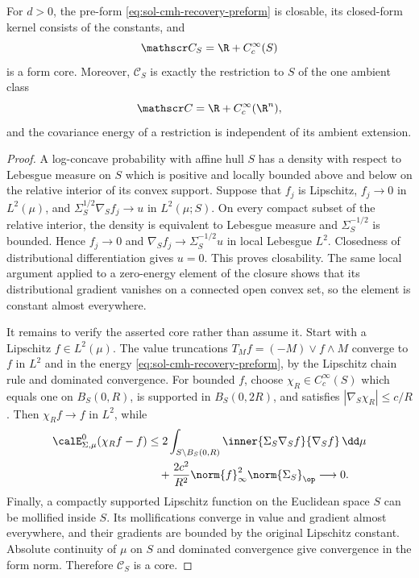 \documentclass[../main.tex]{subfiles}
\begin{document}
\begin{lemma}
\label{lem:sol-cmh-recovery-common-core}
For $d>0$, the pre-form \eqref{eq:sol-cmh-recovery-preform} is closable, its closed-form kernel
consists of the constants, and
\[
  \mathscr C_S=\R+C_c^\infty(S)
\]
is a form core.  Moreover, $\mathscr C_S$ is exactly the restriction to $S$ of the one ambient
class
\[
  \mathscr C=\R+C_c^\infty(\R^n),
  \label{eq:sol-cmh-recovery-ambient-core}
\]
and the covariance energy of a restriction is independent of its ambient extension.
\end{lemma}

\begin{proof}
A log-concave probability with affine hull $S$ has a density with respect to Lebesgue measure
on $S$ which is positive and locally bounded above and below on the relative interior of its
convex support.  Suppose that $f_j$ is Lipschitz,
$f_j\to0$ in $L^2(\mu)$, and $\Sigma_S^{1/2}\nabla_Sf_j\to u$ in
$L^2(\mu;S)$.  On every compact subset of the relative interior, the density is equivalent to
Lebesgue measure and $\Sigma_S^{-1/2}$ is bounded.  Hence
$f_j\to0$ and $\nabla_Sf_j\to\Sigma_S^{-1/2}u$ in local Lebesgue $L^2$.
Closedness of distributional differentiation gives $u=0$.  This proves closability.  The same
local argument applied to a zero-energy element of the closure shows that its distributional
gradient vanishes on a connected open convex set, so the element is constant almost
everywhere.

It remains to verify the asserted core rather than assume it.  Start with a Lipschitz
$f\in L^2(\mu)$.  The value truncations $T_Mf=(-M)\vee f\wedge M$ converge to $f$ in $L^2$
and in the energy \eqref{eq:sol-cmh-recovery-preform}, by the Lipschitz chain rule and dominated
convergence.  For bounded $f$, choose $\chi_R\in C_c^\infty(S)$ which equals one on
$B_S(0,R)$, is supported in $B_S(0,2R)$, and satisfies
$|\nabla_S\chi_R|\le c/R$.  Then $\chi_Rf\to f$ in $L^2$, while
\begin{align*}
 \calE^0_{\Sigma,\mu}(\chi_Rf-f)
 &\le 2\int_{S\setminus B_S(0,R)}
          \inner{\Sigma_S\nabla_Sf}{\nabla_Sf}\,\dd\mu \\
 &\quad+\frac{2c^2}{R^2}\norm{f}_\infty^2\norm{\Sigma_S}_\op
 \longrightarrow0.
\end{align*}
Finally, a compactly supported Lipschitz function on the Euclidean space $S$ can be mollified
inside $S$.  Its mollifications converge in value and gradient almost everywhere, and their
gradients are bounded by the original Lipschitz constant.  Absolute continuity of $\mu$ on
$S$ and dominated convergence give convergence in the form norm.  Therefore
$\mathscr C_S$ is a core.


\end{proof}
\end{document}
